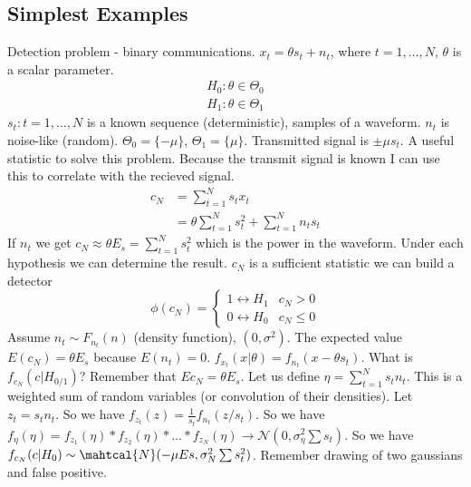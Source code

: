 \documentclass[a4paper]{article}
\begin{document}
\subsection*{Simplest Examples}
Detection problem - binary communications. $x_t = \theta s_t + n_t$, where $t = 1, \dots, N$, $\theta$ is a scalar parameter. 
\[
    \begin{aligned}
 H_0: \theta \in \Theta_0 \\
 H_1: \theta \in \Theta_1       
    \end{aligned}
\]
$s_t: t = 1, \dots, N$ is a known sequence (deterministic), samples of a waveform. $n_t$ is noise-like (random). $\Theta_0 = \{-\mu\}$, $\Theta_1 = \{\mu\}$. Transmitted signal is $\pm \mu s_t$. A useful statistic to solve this problem. Because the transmit signal is known I can use this to correlate with the recieved signal. 
\[
    \begin{aligned}
        c_N &= \sum_{t=1}^N s_tx_t \\
            &= \theta \sum_{t=1}^N s_t^2 +  \sum_{t=1}^N n_ts_t
    \end{aligned}
\]
If $n_t$ we get $c_N \approx \theta E_s = \sum_{t=1}^N s_t^2$ which is the power in the waveform. Under each hypothesis we can determine the result. $c_N$ is a sufficient statistic  we can build a detector
\[
    \phi(c_N) = 
    \begin{cases}
        1 \leftrightarrow H_1 & c_N > 0 \\ 
        0 \leftrightarrow H_0 & c_N \leq 0
    \end{cases}
\]
Assume $n_t \sim F_{n_t}(n)$ (density function), $(0, \sigma^2)$. The expected value $E(c_N) = \theta E_s$ because $E(n_t) = 0$. $f_{x_t}(x | \theta) = f_{n_t}(x - \theta s_t)$. What is $f_{c_N}(c | H_{0/1})$? Remember that $E{c_N} = \theta E_s$. Let us define $\eta = \sum_{t=1}^N s_tn_t$. This is a weighted sum of random variables (or convolution of their densities). Let $z_t = s_tn_t$. So we have $f_{z_t}(z) = \frac{1}{s_t} f_{n_t}(z/s_t)$. So we have $f_{\eta}( \eta) = f_{z_1}(\eta) * f_{z_2}(\eta) * \dots * f_{z_N}(\eta) \rightarrow \mathcal{N}(0, \sigma_{\eta}^2 \sum s_t)$. So we have $f_{c_N}(c| H_0) \sim \mahtcal{N}(-\mu Es, \sigma_N^2 \sum s_t^2)$. Remember drawing of two gaussians and false positive.
\end{document}

